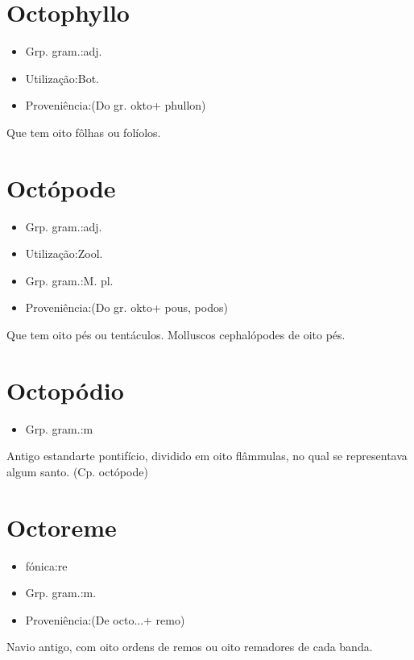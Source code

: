 \section{Octophyllo}
\begin{itemize}
\item {Grp. gram.:adj.}
\end{itemize}
\begin{itemize}
\item {Utilização:Bot.}
\end{itemize}
\begin{itemize}
\item {Proveniência:(Do gr. \textunderscore okto\textunderscore  + \textunderscore phullon\textunderscore )}
\end{itemize}
Que tem oito fôlhas ou folíolos.
\section{Octópode}
\begin{itemize}
\item {Grp. gram.:adj.}
\end{itemize}
\begin{itemize}
\item {Utilização:Zool.}
\end{itemize}
\begin{itemize}
\item {Grp. gram.:M. pl.}
\end{itemize}
\begin{itemize}
\item {Proveniência:(Do gr. \textunderscore okto\textunderscore  + \textunderscore pous, podos\textunderscore )}
\end{itemize}
Que tem oito pés ou tentáculos.
Molluscos cephalópodes de oito pés.
\section{Octopódio}
\begin{itemize}
\item {Grp. gram.:m}
\end{itemize}
Antigo estandarte pontifício, dividido em oito flâmmulas, no qual se representava algum santo.
(Cp. \textunderscore octópode\textunderscore )
\section{Octoreme}
\begin{itemize}
\item {fónica:re}
\end{itemize}
\begin{itemize}
\item {Grp. gram.:m.}
\end{itemize}
\begin{itemize}
\item {Proveniência:(De \textunderscore octo...\textunderscore  + \textunderscore remo\textunderscore )}
\end{itemize}
Navio antigo, com oito ordens de remos ou oito remadores de cada banda.
